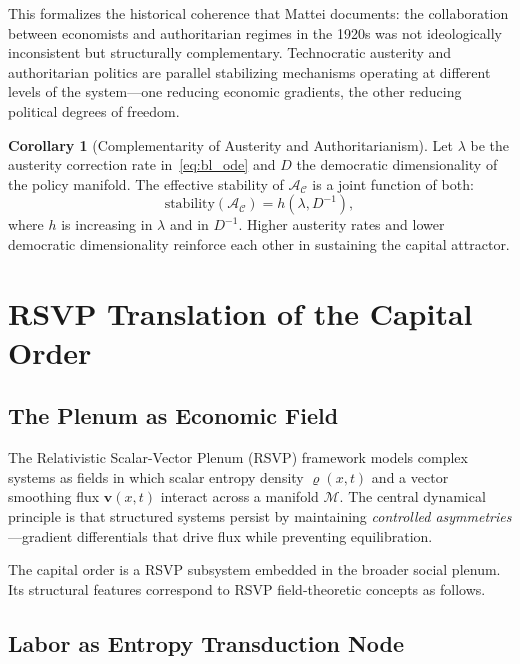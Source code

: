 \documentclass[12pt,a4paper]{article}
\theoremstyle{definition}
\newtheorem{corollary}{Corollary}[section]
\theoremstyle{remark}
\begin{document}
This formalizes the historical coherence that Mattei documents: the collaboration between economists and authoritarian regimes in the 1920s was not ideologically inconsistent but structurally complementary. Technocratic austerity and authoritarian politics are parallel stabilizing mechanisms operating at different levels of the system---one reducing economic gradients, the other reducing political degrees of freedom.

\begin{corollary}[Complementarity of Austerity and Authoritarianism]
Let $\lambda$ be the austerity correction rate in~\eqref{eq:bl_ode} and $D$ the democratic dimensionality of the policy manifold. The effective stability of $\mathcal{A}_\mathcal{C}$ is a joint function of both:
\begin{equation}
  \text{stability}(\mathcal{A}_\mathcal{C}) = h(\lambda, D^{-1}),
\end{equation}
where $h$ is increasing in $\lambda$ and in $D^{-1}$. Higher austerity rates and lower democratic dimensionality reinforce each other in sustaining the capital attractor.
\end{corollary}

\section{RSVP Translation of the Capital Order}
\label{sec:rsvp}

\subsection{The Plenum as Economic Field}

The Relativistic Scalar-Vector Plenum (RSVP) framework models complex systems as fields in which scalar entropy density $\varrho(x,t)$ and a vector smoothing flux $\mathbf{v}(x,t)$ interact across a manifold $\mathcal{M}$. The central dynamical principle is that structured systems persist by maintaining \emph{controlled asymmetries}---gradient differentials that drive flux while preventing equilibration.

The capital order is a RSVP subsystem embedded in the broader social plenum. Its structural features correspond to RSVP field-theoretic concepts as follows.

\subsection{Labor as Entropy Transduction Node}
\end{document}
